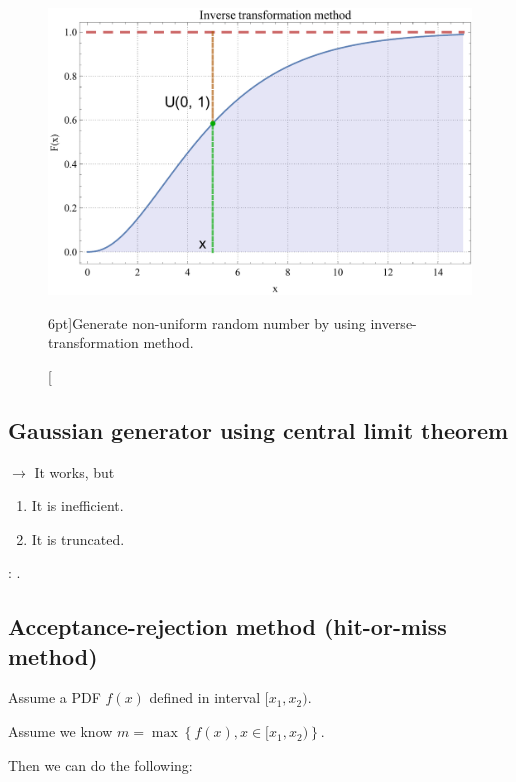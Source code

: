 \begin{figure}
	\includegraphics{monte_carlo/inverse_transformation_method.pdf}
	\caption[Inverse-transformation method.][6pt]{Generate non-uniform random number by using inverse-transformation method.}
	\label{fig:inverse_transformation_method}
\end{figure}

\subsection{Gaussian generator using central limit theorem}
\label{subsec:gaussian_generator}

$\to$ It works, but

\begin{enumerate}
	\item It is  inefficient.
	\item It is truncated.
\end{enumerate}

: .

\subsection{Acceptance-rejection method (hit-or-miss method)}
\label{subsec:acceptance_rejection}

Assume a PDF $f(x)$ defined in interval $[x_{1}, x_{2})$.

Assume we know $m = \max \left\{ f(x), x \in [x_{1}, x_{2}) \right\}$.

Then we can do the following:

